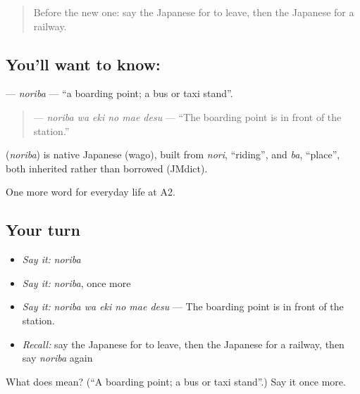 \begin{quote}
Before the new one: say the Japanese for to leave, then the Japanese for a railway.
\end{quote}

\subsection*{You'll want to know: }
\textbf{} — \emph{noriba} — \textquotedblleft{}a boarding point; a bus or taxi stand\textquotedblright{}.

\begin{quote}
\textbf{  } — \emph{noriba wa eki no mae desu} — \textquotedblleft{}The boarding point is in front of the station.\textquotedblright{}
\end{quote}

\begin{cousinweb}
\textbf{} (\emph{noriba}) is native Japanese (wago), built from \emph{nori}, \textquotedblleft{}riding\textquotedblright{}, and \emph{ba}, \textquotedblleft{}place\textquotedblright{}, both inherited rather than borrowed (JMdict).
\end{cousinweb}

\begin{grammarlens}[title={What you've built}]
One more word for everyday life at A2.
\end{grammarlens}

\subsection*{Your turn}
\begin{itemize}
\raggedright
  \item \emph{Say it:} \emph{noriba}
  \item \emph{Say it:} \emph{noriba}, once more
  \item \emph{Say it:} \emph{noriba wa eki no mae desu} — The boarding point is in front of the station.
  \item \emph{Recall:} say the Japanese for to leave, then the Japanese for a railway, then say \emph{noriba} again
\end{itemize}

\begin{tcolorbox}[breakable,colback=teal!4,colframe=teal!35!black,title={Before you move on}]
What does  mean? (\textquotedblleft{}A boarding point; a bus or taxi stand\textquotedblright{}.) Say it once more.
\end{tcolorbox}

